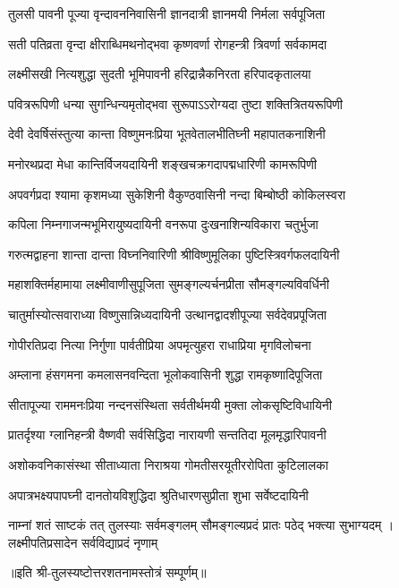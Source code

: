 


{तुलसी पावनी पूज्या वृन्दावननिवासिनी}
{ज्ञानदात्री ज्ञानमयी निर्मला सर्वपूजिता}%

\twolineshloka
{सती पतिव्रता वृन्दा क्षीराब्धिमथनोद्भवा}
{कृष्णवर्णा रोगहन्त्री त्रिवर्णा सर्वकामदा}%

\twolineshloka
{लक्ष्मीसखी नित्यशुद्धा सुदती भूमिपावनी}
{हरिद्रान्नैकनिरता हरिपादकृतालया}%

\twolineshloka
{पवित्ररूपिणी धन्या सुगन्धिन्यमृतोद्भवा}
{सुरूपाऽऽरोग्यदा तुष्टा शक्तित्रितयरूपिणी}%

\twolineshloka
{देवी देवर्षिसंस्तुत्या कान्ता विष्णुमनःप्रिया}
{भूतवेतालभीतिघ्नी महापातकनाशिनी}%

\twolineshloka
{मनोरथप्रदा मेधा कान्तिर्विजयदायिनी}
{शङ्खचक्रगदापद्मधारिणी कामरूपिणी}%

\twolineshloka
{अपवर्गप्रदा श्यामा कृशमध्या सुकेशिनी}
{वैकुण्ठवासिनी नन्दा बिम्बोष्ठी कोकिलस्वरा}%

\twolineshloka
{कपिला निम्नगाजन्मभूमिरायुष्यदायिनी}
{वनरूपा दुःखनाशिन्यविकारा चतुर्भुजा}%

\twolineshloka
{गरुत्मद्वाहना शान्ता दान्ता विघ्ननिवारिणी}
{श्रीविष्णुमूलिका पुष्टिस्त्रिवर्गफलदायिनी}%

\twolineshloka
{महाशक्तिर्महामाया लक्ष्मीवाणीसुपूजिता}
{सुमङ्गल्यर्चनप्रीता सौमङ्गल्यविवर्धिनी}%

\twolineshloka
{चातुर्मास्योत्सवाराध्या विष्णुसान्निध्यदायिनी}
{उत्थानद्वादशीपूज्या सर्वदेवप्रपूजिता}%

\twolineshloka
{गोपीरतिप्रदा नित्या निर्गुणा पार्वतीप्रिया}
{अपमृत्युहरा राधाप्रिया मृगविलोचना}%

\twolineshloka
{अम्लाना हंसगमना कमलासनवन्दिता}
{भूलोकवासिनी शुद्धा रामकृष्णादिपूजिता}%

\twolineshloka
{सीतापूज्या राममनःप्रिया नन्दनसंस्थिता}
{सर्वतीर्थमयी मुक्ता लोकसृष्टिविधायिनी}%

\twolineshloka
{प्रातर्दृश्या ग्लानिहन्त्री वैष्णवी सर्वसिद्धिदा}
{नारायणी सन्ततिदा मूलमृद्धारिपावनी}%

\twolineshloka
{अशोकवनिकासंस्था सीताध्याता निराश्रया}
{गोमतीसरयूतीररोपिता कुटिलालका}%

\twolineshloka
{अपात्रभक्ष्यपापघ्नी दानतोयविशुद्धिदा}
{श्रुतिधारणसुप्रीता शुभा सर्वेष्टदायिनी}%

\threelineshloka
{नाम्नां शतं साष्टकं तत् तुलस्याः सर्वमङ्गलम्}
{सौमङ्गल्यप्रदं प्रातः पठेद् भक्त्या सुभाग्यदम्} ।
{लक्ष्मीपतिप्रसादेन सर्वविद्याप्रदं नृणाम्}%

{॥इति श्री-तुलस्यष्टोत्तरशतनामस्तोत्रं सम्पूर्णम्॥}